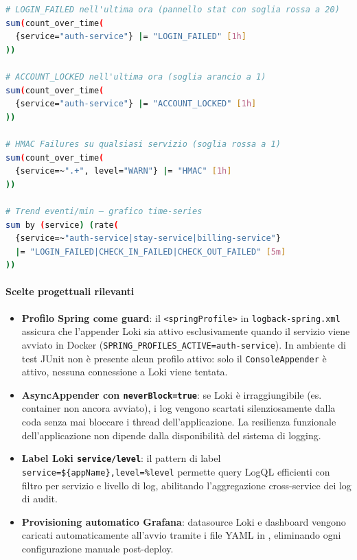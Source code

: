 ﻿\documentclass[a4paper,12pt]{report}
\begin{document}
\vspace{0.5em}
\begin{securebox}[title={Livello 3 --- Query LogQL nella dashboard Grafana}]
\begin{lstlisting}[language=bash, caption={LogQL: pannelli dashboard "Security Audit Log"}]
# LOGIN_FAILED nell'ultima ora (pannello stat con soglia rossa a 20)
sum(count_over_time(
  {service="auth-service"} |= "LOGIN_FAILED" [1h]
))

# ACCOUNT_LOCKED nell'ultima ora (soglia arancio a 1)
sum(count_over_time(
  {service="auth-service"} |= "ACCOUNT_LOCKED" [1h]
))

# HMAC Failures su qualsiasi servizio (soglia rossa a 1)
sum(count_over_time(
  {service=~".+", level="WARN"} |= "HMAC" [1h]
))

# Trend eventi/min — grafico time-series
sum by (service) (rate(
  {service=~"auth-service|stay-service|billing-service"}
  |= "LOGIN_FAILED|CHECK_IN_FAILED|CHECK_OUT_FAILED" [5m]
))
\end{lstlisting}
\end{securebox}

\paragraph{Scelte progettuali rilevanti}

\begin{itemize}
  \item \textbf{Profilo Spring come guard}: il \texttt{<springProfile>} in
        \texttt{logback-spring.xml} assicura che l'appender Loki sia attivo
        esclusivamente quando il servizio viene avviato in Docker
        (\texttt{SPRING\_PROFILES\_ACTIVE=auth-service}). In ambiente di test
        JUnit non è presente alcun profilo attivo: solo il \texttt{ConsoleAppender}
        è attivo, nessuna connessione a Loki viene tentata.
  \item \textbf{AsyncAppender con \texttt{neverBlock=true}}: se Loki è
        irraggiungibile (es. container non ancora avviato), i log vengono
        scartati silenziosamente dalla coda senza mai bloccare i thread
        dell'applicazione. La resilienza funzionale dell'applicazione non
        dipende dalla disponibilità del sistema di logging.
  \item \textbf{Label Loki \texttt{service/level}}: il pattern di label\\
        \texttt{service=\$\{appName\},level=\%level} permette query LogQL
        efficienti con filtro per servizio e livello di log, abilitando
        l'aggregazione cross-service dei log di audit.
  \item \textbf{Provisioning automatico Grafana}: datasource Loki e dashboard
        vengono caricati automaticamente all'avvio tramite i file YAML in
        , eliminando ogni configurazione
        manuale post-deploy.
\end{itemize}
\end{document}
